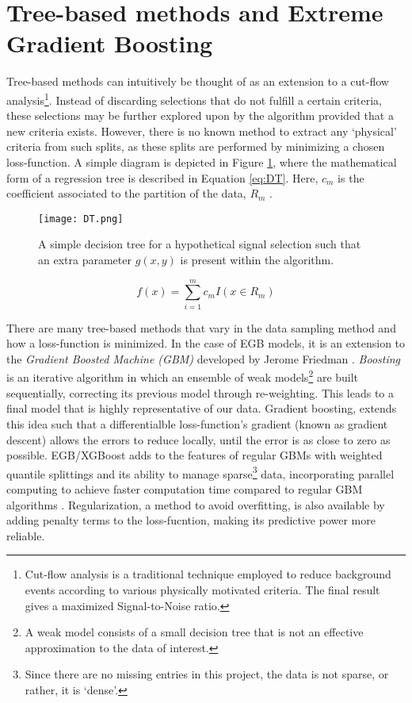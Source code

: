 \section{Tree-based methods and Extreme Gradient Boosting}
\label{sec:method}
Tree-based methods can intuitively be thought of as an extension to a cut-flow analysis\footnote{Cut-flow analysis is a traditional technique employed to reduce background events according to various physically motivated criteria. The final result gives a maximized Signal-to-Noise ratio.}. Instead of discarding selections that do not fulfill a certain criteria, these selections may be further explored upon by the algorithm provided that a new criteria exists. However, there is no known method to extract any `physical' criteria from such splits, as these splits are performed by minimizing a chosen loss-function. A simple diagram is depicted in Figure \ref{fig:tree}, where the mathematical form of a regression tree is described in Equation \ref{eq:DT}. Here, $c_m$ is the coefficient associated to the partition of the data, $R_m$ \cite{james2013introduction}.

\begin{figure}[htbp]
    \centering
    \texttt{[image: DT.png]}
    \caption{A simple decision tree for a hypothetical signal selection such that an extra parameter $g(x,y)$ is present within the algorithm.}
    \label{fig:tree}
\end{figure}

\begin{equation}
    f(x) = \sum_{i=1}^m c_m I(x\in R_m)
    \label{eq:DT}
\end{equation}

There are many tree-based methods that vary in the data sampling method and how a loss-function is minimized. In the case of EGB models, it is an extension to the \textit{Gradient Boosted Machine (GBM)} developed by Jerome Friedman \cite{friedman2001greedy}. \textit{Boosting} is an iterative algorithm in which an ensemble of weak models\footnote{A weak model consists of a small decision tree that is not an effective approximation to the data of interest.} are built sequentially, correcting its previous model through re-weighting. This leads to a final model that is highly representative of our data. Gradient boosting, extends this idea such that a differentialble loss-function's gradient (known as gradient descent) allows the errors to reduce locally, until the error is as close to zero as possible. EGB/XGBoost adds to the features of regular GBMs with weighted quantile splittings and its ability to manage sparse\footnote{Since there are no missing entries in this project, the data is not sparse, or rather, it is `dense'.} data, incorporating parallel computing to achieve faster computation time compared to regular GBM algorithms \cite{chen2016xgboost}. Regularization, a method to avoid overfitting, is also available by adding penalty terms to the loss-fucntion, making its predictive power more reliable. \\

